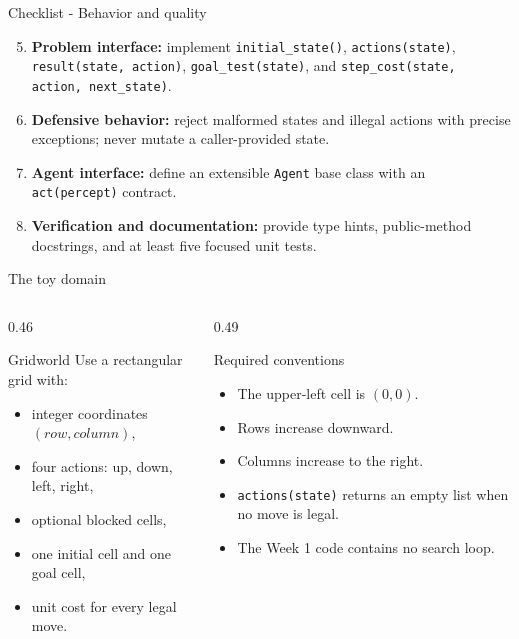 \documentclass[aspectratio=169,11pt]{beamer}
\begin{document}
\begin{frame}{Checklist - Behavior and quality}
  \begin{enumerate}
    \setcounter{enumi}{4}
    \item \textbf{Problem interface:} implement
      \texttt{initial\_state()}, \texttt{actions(state)},
      \texttt{result(state, action)}, \texttt{goal\_test(state)}, and
      \texttt{step\_cost(state, action, next\_state)}.
    \item \textbf{Defensive behavior:} reject malformed states and illegal
      actions with precise exceptions; never mutate a caller-provided state.
    \item \textbf{Agent interface:} define an extensible \texttt{Agent} base
      class with an \texttt{act(percept)} contract.
    \item \textbf{Verification and documentation:} provide type hints,
      public-method docstrings, and at least five focused unit tests.
  \end{enumerate}
\end{frame}

\begin{frame}{The toy domain}
  \begin{columns}[T,onlytextwidth]
    \begin{column}{0.46\textwidth}
      \begin{block}{Gridworld}
        Use a rectangular grid with:
        \begin{itemize}
          \item integer coordinates \((row, column)\),
          \item four actions: up, down, left, right,
          \item optional blocked cells,
          \item one initial cell and one goal cell,
          \item unit cost for every legal move.
        \end{itemize}
      \end{block}
    \end{column}
    \begin{column}{0.49\textwidth}
      \begin{block}{Required conventions}
        \begin{itemize}
          \item The upper-left cell is \((0,0)\).
          \item Rows increase downward.
          \item Columns increase to the right.
          \item \texttt{actions(state)} returns an empty list when no move is legal.
          \item The Week 1 code contains no search loop.
        \end{itemize}
      \end{block}
    \end{column}
  \end{columns}
\end{frame}
\end{document}
